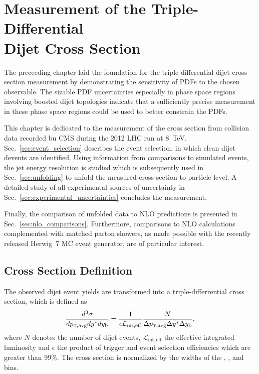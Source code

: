
\chapter[Measurement of the Triple-Differential Dijet Cross Section]{Measurement
of the Triple-Differential\\ Dijet Cross Section}
\label{sec:measurement}

The preceeding chapter laid the foundation for the triple-differential dijet
cross section measurement by demonstrating the sensitivity of PDFs to the chosen
observable. The sizable PDF uncertainties especially in phase space regions
involving boosted dijet topologies indicate that a sufficiently precise
measurement in these phase space regions could be used to better constrain the
PDFs. 

This chapter is dedicated to the measurement of the cross section from collision
data recorded bu CMS during the 2012 LHC run at \SI{8}{\TeV}.
Sec.~\ref{sec:event_selection} describes the event selection, in which clean
dijet devents are identified.  Using information from comparisons to simulated
events, the jet energy resolution is studied which is subsequently used in
Sec.~\ref{sec:unfolding} to unfold the measured cross section to particle-level.
A detailed study of all experimental sources of uncertainty in
Sec.~\ref{sec:experimental_uncertainties} concludes the measurement.

Finally, the comparison of unfolded data to NLO predictions is presented in
Sec.~\ref{sec:nlo_comparisons}. Furthermore, comparisons to NLO calculations
complemented with matched parton showers, as made possible with the recently
released Herwig~7 MC event generator, are of particular interest.

\section{Cross Section Definition}

The observed dijet event yields are transformed into a triple-differrential
cross section, which is defined as
%
\begin{equation*}
    \frac{d^3 \sigma}{d \ptavg d \ystar d \yboost} = \frac{1}{\epsilon
        \mathcal{L}_{\mathrm{int, eff}}} \frac{N}{\Delta \ptavg \Delta \ystar
        \Delta \yboost},
\end{equation*}
%
where $N$ denotes the number of dijet events, $\mathcal{L}_{\mathrm{int, eff}}$ the
effective integrated luminosity and $\epsilon$ the product of trigger and event
selection efficiencies which are greater than 99\%. The cross section is
normalized by the widths of the \ptavg, \ystar, and \yboost bins. 

